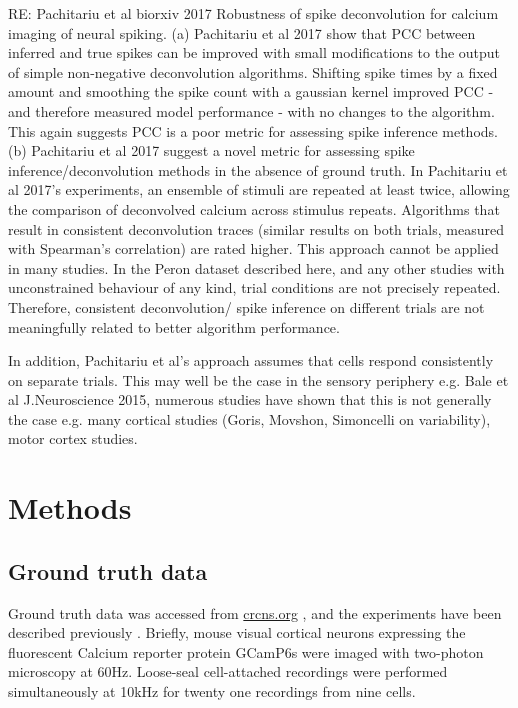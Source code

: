 \documentclass[a4paper,10pt,twocolumn]{article}
\begin{document}
RE: Pachitariu et al biorxiv 2017 Robustness of spike deconvolution for calcium imaging of neural spiking.
(a) Pachitariu et al 2017 show that PCC between inferred and true spikes can be improved with small modifications to the output of simple non-negative deconvolution algorithms. Shifting spike times by a fixed amount and smoothing the spike count with a gaussian kernel improved PCC - and therefore measured model performance - with no changes to the algorithm. This again suggests PCC is a poor metric for assessing spike inference methods.
(b) Pachitariu et al 2017 suggest a novel metric for assessing spike inference/deconvolution methods in the absence of ground truth. In Pachitariu et al 2017's experiments, an ensemble of stimuli are repeated at least twice, allowing the comparison of deconvolved calcium across stimulus repeats. Algorithms that result in consistent deconvolution traces (similar results on both trials, measured with Spearman's correlation) are rated higher. This approach cannot be applied in many studies. In the Peron dataset described here, and any other studies with unconstrained behaviour of any kind, trial conditions are not precisely repeated. Therefore, consistent deconvolution/ spike inference on different trials are not meaningfully related to better algorithm performance. 

In addition, Pachitariu et al's approach assumes that cells respond consistently on separate trials. This may well be the case in the sensory periphery e.g. Bale et al J.Neuroscience 2015, numerous studies have shown that this is not generally the case e.g. many cortical studies (Goris, Movshon, Simoncelli on variability), motor cortex studies.


\clearpage
\section{Methods}
\subsection*{Ground truth data}
Ground truth data was accessed from \href{http://crcns.org/data-sets/methods/cai-1}{crcns.org} \citep{Svoboda2015-ym}, and the experiments have been described previously \cite{Chen2013-nv}. Briefly, mouse visual cortical neurons expressing the fluorescent Calcium reporter protein GCamP6s were imaged with two-photon microscopy at 60Hz. Loose-seal cell-attached recordings were performed simultaneously at 10kHz for twenty one recordings from nine cells.
\end{document}
